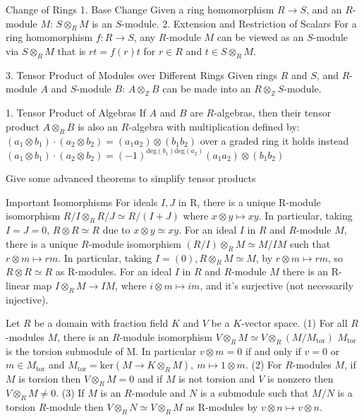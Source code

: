 Change of Rings
1. Base Change
Given a ring homomorphism \(R \rightarrow S\), and an \(R\)-module \(M\):
\(
S \otimes_R M
\)
is an \(S\)-module.
2. Extension and Restriction of Scalars
For a ring homomorphism \(f : R \rightarrow S\), any \(R\)-module \(M\) can be viewed as an \(S\)-module via \(S \otimes_R M\)
that is \( rt = f(r)t \) for \( r \in R \) and \( t \in S \otimes_R M \).

3. Tensor Product of Modules over Different Rings
Given rings \(R\) and \(S\), and \(R\)-module \(A\) and \(S\)-module \(B\):
\(
A \otimes_\mathbb{Z} B
\)
can be made into an \(R \otimes_\mathbb{Z} S\)-module.


1. Tensor Product of Algebras
If \(A\) and \(B\) are \(R\)-algebras, then their tensor product \(A \otimes_R B\) is also an \(R\)-algebra with multiplication defined by:
\(
(a_1 \otimes b_1) \cdot (a_2 \otimes b_2) = (a_1 a_2) \otimes (b_1 b_2)
\)
over a graded ring it holds instead
\(
(a_1 \otimes b_1) \cdot (a_2 \otimes b_2) = (-1)^{\text{deg}(b_1)\text{deg}(a_2)}(a_1 a_2) \otimes (b_1 b_2)
\)


Give some advanced theorems to simplify tensor products

Important Isomorphisms
For ideals \( I, J \) in R, there is a unique R-module isomorphism
\( R/I \otimes_R R/J \simeq R/(I + J) \)
where \( x ⊗ y \mapsto xy \). In particular, taking \( I = J = 0 \), \( R \otimes R \simeq R \) due to \( x \otimes y \simeq xy \).
For an ideal \( I \) in \( R \) and \( R \)-module \( M \), there is a unique \( R \)-module isomorphism
\( (R/I) \otimes_R M \simeq M/IM \)
such that \( r \otimes m \mapsto rm \). 
In particular, taking \( I = (0), R \otimes_R M \simeq M \), by \( r ⊗ m \mapsto rm \), so
\( R \otimes R \simeq R \) as R-modules.
For an ideal \( I \) in \( R \) and \( R \)-module \( M \) there is an R-linear map \( I \otimes_R M \to IM \), 
where \( i \otimes m \mapsto im \), and it’s surjective (not necessarily injective).

Let \( R \) be a domain with fraction field \( K \) and \( V \) be a \( K \)-vector space.
(1) For all \( R \)-modules \( M \), there is an \( R \)-module isomorphism \( V \otimes_R M \simeq V \otimes_R (M/M_{\text{tor}})\) 
\(M_{\text{tor}}\) is the torsion submodule of M. In particular \( v \otimes m = 0 \) if and only if \( v = 0 \) or \( m \in M_{\text{tor}} \)
and \( M_{\text{tor}} = \text{ker}(M \to K \otimes_R M),\ m \mapsto 1 \otimes m \).
(2) For \( R \)-modules \( M \), if \( M \) is torsion then \( V \otimes_R M = 0 \) and if \( M \) is not torsion and
\( V \) is nonzero then \( V \otimes_R M \neq 0 \).
(3) If \( M \) is an \( R \)-module and \( N \) is a submodule such that \( M/N \) is a torsion \( R \)-module
then \( V \otimes_R N \simeq V \otimes_R M \) as R-modules by \( v \otimes n \mapsto v \otimes n\).


